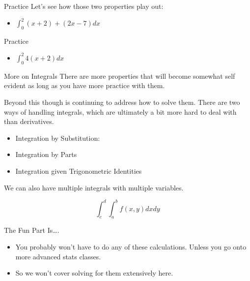\documentclass[
  ignorenonframetext,
]{beamer}
\providecommand{\tightlist}{%
  \setlength{\itemsep}{0pt}\setlength{\parskip}{0pt}}
\begin{document}
\begin{frame}{Practice}
\protect\hypertarget{practice}{}
Let's see how those two properties play out:

\begin{itemize}[<+->]
\tightlist
\item
  \(\int^2_0 (x+2) + (2x-7) dx\)
\end{itemize}




\end{frame}

\begin{frame}{Practice}
\protect\hypertarget{practice-1}{}
\begin{itemize}[<+->]
\tightlist
\item
  \(\int^2_0 4(x+2) dx\)
\end{itemize}



\end{frame}

\begin{frame}{More on Integrals}
\protect\hypertarget{more-on-integrals}{}
There are more properties that will become somewhat self evident as long
as you have more practice with them.

Beyond this though is continuing to address how to solve them. There are
two ways of handling integrals, which are ultimately a bit more hard to
deal with than derivatives.

\begin{itemize}
\item
  Integration by Substitution:
\item
  Integration by Parts
\item
  Integration given Trigonometric Identities
\end{itemize}

We can also have multiple integrals with multiple variables.

\[ \int_c^d \int_a^b f(x,y) dxdy\]
\end{frame}

\begin{frame}{The Fun Part Is\ldots.}
\protect\hypertarget{the-fun-part-is.}{}
\begin{itemize}
\item
  You probably won't have to do any of these calculations. Unless you go
  onto more advanced stats classes.
\item
  So we won't cover solving for them extensively here.
\end{itemize}
\end{frame}
\end{document}
